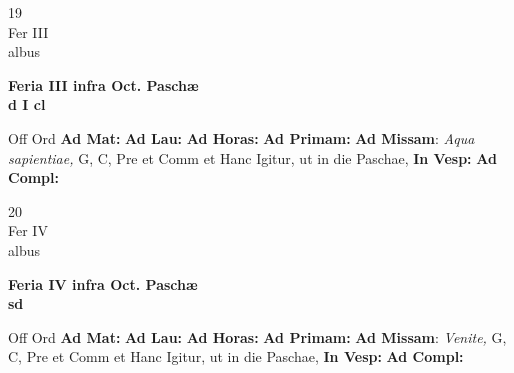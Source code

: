 \documentclass[10pt, openany]{book}
\begin{document}
        \begin{center}
            \begin{minipage}{3.5in}
                \vspace{2em}
                \begin{minipage}{0.5in}
                    {\Huge 19} \\
                    {\normalsize Fer III} \\
                    {\normalsize albus}
                \end{minipage}
                \begin{minipage}{3.0in}
                    \textbf{ \large Feria III infra Oct. Paschæ \\
                    \textnormal{\normalsize d I cl}} \\ 
                \end{minipage}
                \begin{justify}Off Ord
                    \textbf{Ad Mat: }
                    \textbf{Ad Lau: }
                    \textbf{Ad Horas: }
                    \textbf{Ad Primam: }\textbf{Ad Missam}: \textit{Aqua sapientiae,} G, C, Pre et Comm et Hanc Igitur, ut in die Paschae,  
                    \textbf{In Vesp: }
                    \textbf{Ad Compl: }
                \end{justify}
            \end{minipage}
        \end{center}
    
        \begin{center}
            \begin{minipage}{3.5in}
                \vspace{2em}
                \begin{minipage}{0.5in}
                    {\Huge 20} \\
                    {\normalsize Fer IV} \\
                    {\normalsize albus}
                \end{minipage}
                \begin{minipage}{3.0in}
                    \textbf{ \large Feria IV infra Oct. Paschæ \\
                    \textnormal{\normalsize sd}} \\ 
                \end{minipage}
                \begin{justify}Off Ord
                    \textbf{Ad Mat: }
                    \textbf{Ad Lau: }
                    \textbf{Ad Horas: }
                    \textbf{Ad Primam: }\textbf{Ad Missam}: \textit{Venite,} G, C, Pre et Comm et Hanc Igitur, ut in die Paschae,  
                    \textbf{In Vesp: }
                    \textbf{Ad Compl: }
                \end{justify}
            \end{minipage}
        \end{center}
    
\end{document}
